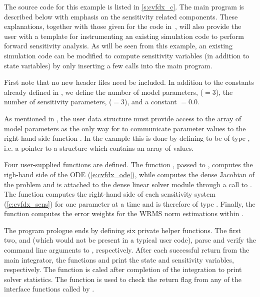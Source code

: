 The source code for this example is listed in \A\ref{s:cvfdx_c}. The main program is described 
below with emphasis on the sensitivity related components. 
These explanations, together with those given for the code 
in~\cite{cvode2.4.0_ex}, will also provide the user with a template for instrumenting 
an existing simulation code to perform forward sensitivity analysis.
As will be seen from this example, an existing simulation code can be modified to compute 
sensitivity variables (in addition to state variables) by only inserting a few {\cvodes} 
calls into the main program. 

First note that no new header files need be included. In addition to the constants already
defined in , we define the number of model parameters,  ($=3$),
the number of sensitivity parameters,  ($=3$), and a constant  $=0.0$. 

As mentioned in , the user data
structure  must provide access to the array of model parameters 
as the only way for {\cvodes} to communicate parameter values to the right-hand side 
function . In the  example this is done by defining  to be 
of type , i.e. a pointer to a structure which contains an array of 
  values.

Four user-supplied functions are defined. The function , passed to
, computes the righ-hand side of the ODE (\ref{e:cvfdx_ode}), while
 computes the dense Jacobian of the problem and is attached to the
dense linear solver module {\cvdense} through a call to .
The function  computes the right-hand side of each sensitivity system
(\ref{e:cvfdx_sens}) for one parameter at a time and is therefore of type
. Finally, the function  computes the error weights for the WRMS norm
estimations within {\cvodes}.

The program prologue ends by defining six private helper functions. 
The first two,  and  (which would not be present in 
a typical user code), parse and verify the command line arguments to , respectively.
After each successful return from the main {\cvodes} integrator, the functions 
 and  print the state and sensitivity variables,
respectively. The function  is caled after completion of the
integration to print solver statistics.
The function  is used to check the return flag from any of the
{\cvodes} interface functions called by .

